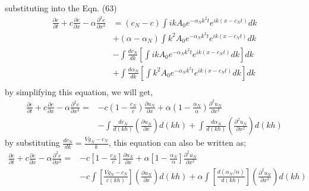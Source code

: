 \documentclass[showpacs,preprintnumbers,amsmath,amssymb]{revtex4-1} %
\begin{document}
substituting into the Eqn. (63)
\begin{equation}
\begin{aligned}
\frac{\partial e}{\partial t}+c\frac{\partial e}{\partial x}-\alpha\frac{\partial^2 e}{\partial x^2}&=(c_N-c)\int ikA_0 e^{-\alpha_Nk^2t}e^{ik(x-c_Nt)}dk\\ &+ (\alpha-\alpha_N)\int k^2A_0 e^{-\alpha_Nk^2t}e^{ik(x-c_Nt)}dk\\ & - \int \frac{dc_N}{dk} \left[\int ikA_0 e^{-\alpha_Nk^2t}e^{ik(x-c_Nt)}dk \right]dk\\ & + \int \frac{d\alpha_N}{dk} \left[\int k^2A_0 e^{-\alpha_Nk^2t}e^{ik(x-c_Nt)}dk\right] dk\\
\end{aligned}
\end{equation}
by simplifying this equation, we will get,
\begin{equation}
\begin{aligned}
\frac{\partial e}{\partial t}+c\frac{\partial e}{\partial x}-\alpha\frac{\partial^2 e}{\partial x^2}=&-c\left(1-\frac{c_N}{c}\right)\frac{\partial u_N}{\partial x}+ \alpha\left(1-\frac{\alpha_N}{\alpha}\right)\frac{\partial^2 u_N}{\partial x^2}\\ & - \int \frac{dc_N}{d(kh)} \left( \frac{\partial u_N}{\partial x} \right) d(kh)+ \int \frac{d\alpha_N}{d(kh)} \left( \frac{\partial^2 u_N}{\partial x^2} \right) d(kh)
\end{aligned}
\end{equation}
by substituting $\frac{dc_N}{dk}=\frac{Vg_N-c_N}{k}$, this equation can also be written as;
\begin{equation}
\begin{aligned}
\frac{\partial e}{\partial t}+c\frac{\partial e}{\partial x}-\alpha\frac{\partial^2 e}{\partial x^2}=&-c\left[1-\frac{c_N}{c}\right]\frac{\partial u_N}{\partial x}+ \alpha\left[1-\frac{\alpha_N}{\alpha}\right]\frac{\partial^2 u_N}{\partial x^2}\\ & - c \int \left[\frac{Vg_N-c_N}{c(kh)}\right] \left( \frac{\partial u_N}{\partial x} \right) d(kh)+ \alpha \int \left[ \frac{d(\alpha_N/\alpha)}{d(kh)}\right] \left( \frac{\partial^2 u_N}{\partial x^2} \right) d(kh)
\end{aligned}
\end{equation}
\end{document}
